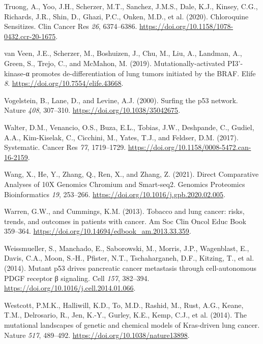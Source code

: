 \begin{CSLReferences}{0}{0}
\leavevmode{}%
Truong, A., Yoo, J.H., Scherzer, M.T., Sanchez, J.M.S., Dale, K.J., Kinsey, C.G., Richards, J.R., Shin, D., Ghazi, P.C., Onken, M.D., et al. (2020). Chloroquine Sensitizes. Clin Cancer Res \emph{26}, 6374--6386. \url{https://doi.org/10.1158/1078-0432.ccr-20-1675}.

\leavevmode{}%
van Veen, J.E., Scherzer, M., Boshuizen, J., Chu, M., Liu, A., Landman, A., Green, S., Trejo, C., and McMahon, M. (2019). Mutationally-activated PI3'-kinase-α promotes de-differentiation of lung tumors initiated by the BRAF. Elife \emph{8}. \url{https://doi.org/10.7554/elife.43668}.

\leavevmode{}%
Vogelstein, B., Lane, D., and Levine, A.J. (2000). Surfing the p53 network. Nature \emph{408}, 307--310. \url{https://doi.org/10.1038/35042675}.

\leavevmode{}%
Walter, D.M., Venancio, O.S., Buza, E.L., Tobias, J.W., Deshpande, C., Gudiel, A.A., Kim-Kiselak, C., Cicchini, M., Yates, T.J., and Feldser, D.M. (2017). Systematic. Cancer Res \emph{77}, 1719--1729. \url{https://doi.org/10.1158/0008-5472.can-16-2159}.

\leavevmode{}%
Wang, X., He, Y., Zhang, Q., Ren, X., and Zhang, Z. (2021). Direct Comparative Analyses of 10X Genomics Chromium and Smart-seq2. Genomics Proteomics Bioinformatics \emph{19}, 253--266. \url{https://doi.org/10.1016/j.gpb.2020.02.005}.

\leavevmode{}%
Warren, G.W., and Cummings, K.M. (2013). Tobacco and lung cancer: risks, trends, and outcomes in patients with cancer. Am Soc Clin Oncol Educ Book 359--364. \url{https://doi.org/10.14694/edbook_am.2013.33.359}.

\leavevmode{}%
Weissmueller, S., Manchado, E., Saborowski, M., Morris, J.P., Wagenblast, E., Davis, C.A., Moon, S.-H., Pfister, N.T., Tschaharganeh, D.F., Kitzing, T., et al. (2014). Mutant p53 drives pancreatic cancer metastasis through cell-autonomous PDGF receptor β signaling. Cell \emph{157}, 382--394. \url{https://doi.org/10.1016/j.cell.2014.01.066}.

\leavevmode{}%
Westcott, P.M.K., Halliwill, K.D., To, M.D., Rashid, M., Rust, A.G., Keane, T.M., Delrosario, R., Jen, K.-Y., Gurley, K.E., Kemp, C.J., et al. (2014). The mutational landscapes of genetic and chemical models of Kras-driven lung cancer. Nature \emph{517}, 489--492. \url{https://doi.org/10.1038/nature13898}.


\end{CSLReferences}
